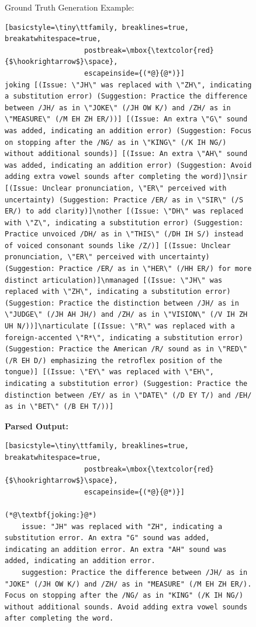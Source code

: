 \documentclass[11pt]{article}
\begin{document}
\begin{figure}[ht]
\begin{AIBox}{Ground Truth Generation Example:}
\begin{minipage}[t]{\textwidth}
\begin{lstlisting}[basicstyle=\tiny\ttfamily, breaklines=true, breakatwhitespace=true,
                   postbreak=\mbox{\textcolor{red}{$\hookrightarrow$}\space},
                   escapeinside={(*@}{@*)}]
joking [(Issue: \"JH\" was replaced with \"ZH\", indicating a substitution error) (Suggestion: Practice the difference between /JH/ as in \"JOKE\" (/JH OW K/) and /ZH/ as in \"MEASURE\" (/M EH ZH ER/))] [(Issue: An extra \"G\" sound was added, indicating an addition error) (Suggestion: Focus on stopping after the /NG/ as in \"KING\" (/K IH NG/) without additional sounds)] [(Issue: An extra \"AH\" sound was added, indicating an addition error) (Suggestion: Avoid adding extra vowel sounds after completing the word)]\nsir [(Issue: Unclear pronunciation, \"ER\" perceived with uncertainty) (Suggestion: Practice /ER/ as in \"SIR\" (/S ER/) to add clarity)]\nother [(Issue: \"DH\" was replaced with \"Z\", indicating a substitution error) (Suggestion: Practice unvoiced /DH/ as in \"THIS\" (/DH IH S/) instead of voiced consonant sounds like /Z/)] [(Issue: Unclear pronunciation, \"ER\" perceived with uncertainty) (Suggestion: Practice /ER/ as in \"HER\" (/HH ER/) for more distinct articulation)]\nmanaged [(Issue: \"JH\" was replaced with \"ZH\", indicating a substitution error) (Suggestion: Practice the distinction between /JH/ as in \"JUDGE\" (/JH AH JH/) and /ZH/ as in \"VISION\" (/V IH ZH UH N/))]\narticulate [(Issue: \"R\" was replaced with a foreign-accented \"R*\", indicating a substitution error) (Suggestion: Practice the American /R/ sound as in \"RED\" (/R EH D/) emphasizing the retroflex position of the tongue)] [(Issue: \"EY\" was replaced with \"EH\", indicating a substitution error) (Suggestion: Practice the distinction between /EY/ as in \"DATE\" (/D EY T/) and /EH/ as in \"BET\" (/B EH T/))]
\end{lstlisting}
\end{minipage}

\tcbline

\begin{minipage}[t]{\textwidth}
{\bf Parsed Output:} \scriptsize
\begin{lstlisting}[basicstyle=\tiny\ttfamily, breaklines=true, breakatwhitespace=true,
                   postbreak=\mbox{\textcolor{red}{$\hookrightarrow$}\space},
                   escapeinside={(*@}{@*)}]

(*@\textbf{joking:}@*)
    issue: "JH" was replaced with "ZH", indicating a substitution error. An extra "G" sound was added, indicating an addition error. An extra "AH" sound was added, indicating an addition error.
    suggestion: Practice the difference between /JH/ as in "JOKE" (/JH OW K/) and /ZH/ as in "MEASURE" (/M EH ZH ER/). Focus on stopping after the /NG/ as in "KING" (/K IH NG/) without additional sounds. Avoid adding extra vowel sounds after completing the word.


\end{lstlisting}
\end{minipage}
\end{AIBox}
\end{figure}
\end{document}
